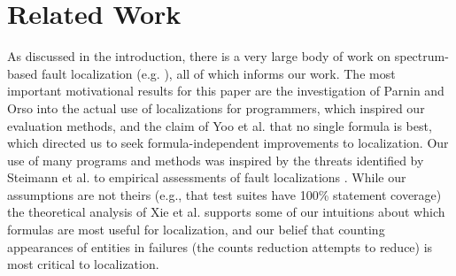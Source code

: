 \section{Related Work}

As discussed in the introduction, there is a very large body of work
on spectrum-based fault localization
(e.g. \cite{Tarantula,Ochai,AMPLE,Pinpoint,StatDebug,StatDebug2,EmpirReduce,Abreu:2006:PRDC,Santelices:ICSE:2009,Entropy,CCT}),
all of which informs our work.  The most important motivational
results for this paper are the investigation of Parnin and Orso
\cite{AutoHelp} into the actual use of localizations for programmers,
which inspired our evaluation methods, and the claim of Yoo et
al. \cite{yoo2014no} that no single formula is best, which directed us
to seek formula-independent improvements to localization.  Our use of
many programs and methods was inspired by the threats identified by
Steimann et al. to empirical assessments of fault localizations
\cite{Threats}.  While our assumptions are not theirs (e.g., that test
suites have 100\% statement coverage) the theoretical analysis of Xie
et al. \cite{Theoretical} supports some of our intuitions about which
formulas are most useful for localization, and our belief that
counting appearances of entities in failures (the counts reduction
attempts to reduce) is most critical to localization.


